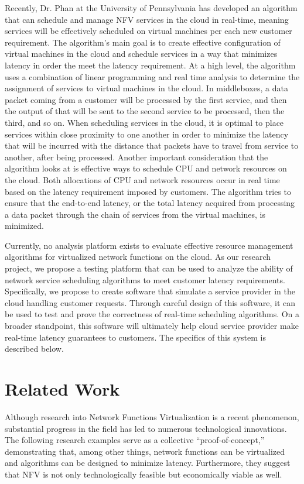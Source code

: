 \documentclass{sig-alternate}
\begin{document}
Recently, Dr. Phan at the University of Pennsylvania has developed an algorithm that can schedule and manage NFV services in the cloud in real-time, meaning services will be effectively scheduled on virtual machines per each new customer requirement. The algorithm’s main goal is to create effective configuration of virtual machines in the cloud and schedule services in a way that minimizes latency in order the meet the latency requirement. At a high level, the algorithm uses a combination of linear programming and real time analysis to determine the assignment of services to virtual machines in the cloud. In middleboxes, a data packet coming from a customer will be processed by the first service, and then the output of that will be sent to the second service to be processed, then the third, and so on. When scheduling services in the cloud, it is optimal to place services within close proximity to one another in order to minimize the latency that will be incurred with the distance that packets have to travel from service to another, after being processed. Another important consideration that the algorithm looks at is effective ways to schedule CPU and network resources on the cloud. Both allocations of CPU and network resources occur in real time based on the latency requirement imposed by customers. The algorithm tries to ensure that the end-to-end latency, or the total latency acquired from processing a data packet through the chain of services from the virtual machines, is minimized.

Currently, no analysis platform exists to evaluate effective resource management algorithms for virtualized network functions on the cloud. As our research project, we propose a testing platform that can be used to analyze the ability of network service scheduling algorithms to meet customer latency requirements. Specifically, we propose to create software that simulate a service provider in the cloud handling customer requests. Through careful design of this software, it can be used to test and prove the correctness of real-time scheduling algorithms. On a broader standpoint, this software will ultimately help cloud service provider make real-time latency guarantees to customers. The specifics of this system is described below.


\section{Related Work}
\label{sec:related_work}
Although research into Network Functions Virtualization is a recent phenomenon, substantial progress in the field has led to numerous technological innovations. The following research examples serve as a collective “proof-of-concept,” demonstrating that, among other things, network functions can be virtualized and algorithms can be designed to minimize latency. Furthermore, they suggest that NFV is not only technologically feasible but economically viable as well.
\end{document}
